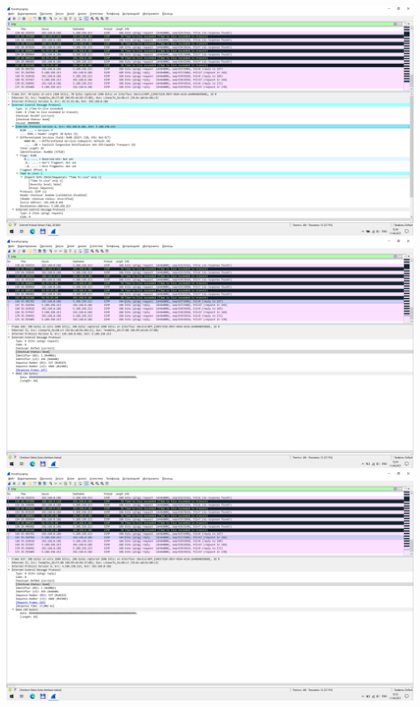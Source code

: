 \includegraphics{screenshots/tracert_ttl_response_2}
\includegraphics{screenshots/tracert_success_request_1}
\includegraphics{screenshots/tracert_success_response_1}
